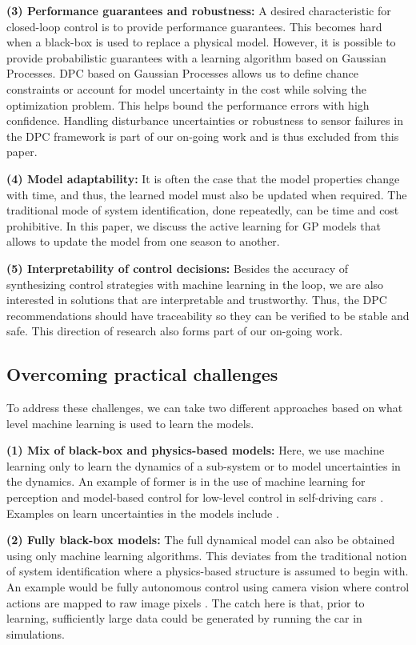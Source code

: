 \noindent \textbf{(3) Performance guarantees and robustness:} A desired characteristic for closed-loop control is to provide performance guarantees. This becomes hard when a black-box is used to replace a physical model. However, it is possible to provide probabilistic guarantees with a learning algorithm based on Gaussian Processes. DPC based on Gaussian Processes allows us to define chance constraints or account for model uncertainty in the cost while solving the optimization problem. This helps bound the performance errors with high confidence. Handling disturbance uncertainties or robustness to sensor failures in the DPC framework is part of our on-going work and is thus excluded from this paper.

\noindent \textbf{(4) Model adaptability:} It is often the case that the model properties change with time, and thus, the learned model must also be updated when required. The traditional mode of system identification, done repeatedly, can be time and cost prohibitive. In this paper, we discuss the active learning for GP models that allows to update the model from one season to another.

\noindent \textbf{(5) Interpretability of control decisions:} Besides the accuracy of synthesizing control strategies with machine learning in the loop, we are also interested in solutions that are interpretable and trustworthy. Thus, the DPC recommendations should have traceability so they can be verified to be stable and safe. This direction of research also forms part of our on-going work.

\subsection{Overcoming practical challenges}
To address these challenges, we can take two different approaches based on what level machine learning is used to learn the models.

\noindent \textbf{(1) Mix of black-box and physics-based models:} Here, we use machine learning only to learn the dynamics of a sub-system or to model uncertainties in the dynamics. An example of former is in the use of machine learning for perception and model-based control for low-level control in self-driving cars \cite{Urmson2008}. Examples on learn uncertainties in the models include \cite{Berkenkamp2015,Desaraju2016}.

\noindent \textbf{(2) Fully black-box models:} The full dynamical model can also be obtained using only machine learning algorithms. This deviates from the traditional notion of system identification where a physics-based structure is assumed to begin with. An example would be fully autonomous control using camera vision where control actions are mapped to raw image pixels \cite{Bojarski2016}. The catch here is that, prior to learning, sufficiently large data could be generated by running the car in simulations.

